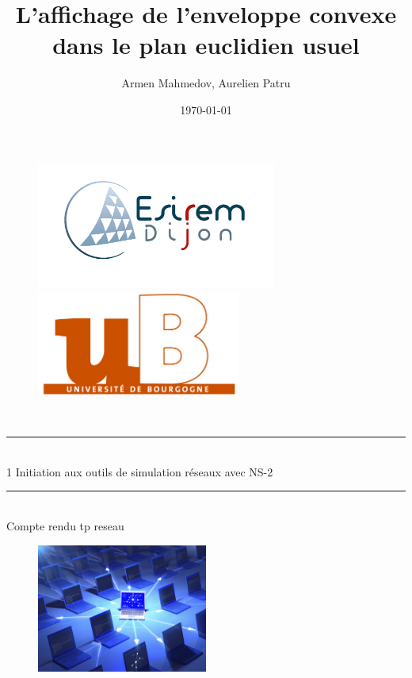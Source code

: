 \documentclass[11pt]{article}
\title{L'affichage de l'enveloppe convexe dans le plan euclidien usuel}
\author{Armen Mahmedov, Aurelien Patru}
\date{\today}
\begin{document}
\begin{titlepage}
	\newcommand{\HRule}{\rule{\linewidth}{0.2mm}}     
            
	\begin{figure}[t]
		\begin{minipage}{0.5\textwidth}\large
			\begin{flushleft}
				\includegraphics[width=0.7\textwidth]{assets/logoEsirem.jpg}
			\end{flushleft}
		\end{minipage}
		\begin{minipage}{0.5\textwidth}\large
			\begin{flushright}
			\includegraphics[width=0.6\textwidth]{assets/logoUb.jpg}
			\end{flushright}
		\end{minipage}
	\end{figure}
	\textsc{ \\[1cm]}
     
     
	\begin{center}
	\HRule \\1
	{\Large   
		Initiation aux outils de simulation réseaux avec NS-2
	}
	\HRule
	\\[0.5cm]
	{\large Compte rendu tp reseau \\}
   \end{center}

	\begin{figure}[h]
		\begin{center}
			\includegraphics[width=0.5\textwidth]{assets/main.jpg}
		\end{center}
	\end{figure}
        

\end{titlepage}
\end{document}
